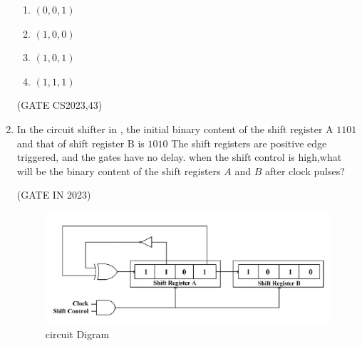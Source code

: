 \begin{enumerate}[label=\arabic*.,ref=\theenumi]
\begin{enumerate}
    \item ${(0,0,1)}$
    \item ${(1,0,0)}$
    \item ${(1,0,1)}$
    \item ${(1,1,1)}$
\end{enumerate}
\hfill(GATE CS2023,43)
\item In the circuit shifter in 
,
the initial binary content of the shift register A $1101$ and that of shift register B is $1010$ The shift registers are positive edge triggered, and the gates have no delay.
when the shift control is high,what will be the binary content of the shift registers $A$ and $B$ after clock pulses?

\hfill{(GATE IN 2023)}

\begin{figure}[H]
\centering
\includegraphics[width=0.75\columnwidth]{ide/7474/figs/Gate.png}
\caption{circuit Digram}
\label{fig:cricuit Digram}
\end{figure}


\end{enumerate}
